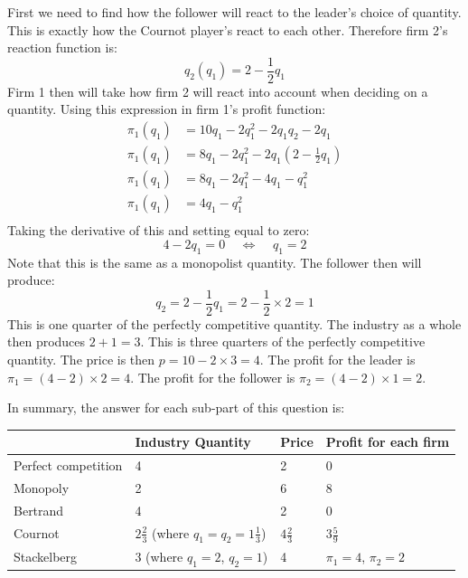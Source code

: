 \documentclass[12pt]{article}
\newcounter{question}[section]
\newenvironment{subquestions}{
  \begin{enumerate}[label=(\roman*)]}{\end{enumerate}}
\begin{document}
\begin{subquestions}
    \textcolor{solution-color}{
      First we need to find how the follower will react to the leader's choice
      of quantity. This is exactly how the Cournot player's react to each
      other. Therefore firm 2's reaction function is:
      \[
        q_2\left( q_1 \right)=2-\frac{1}{2}q_1
      \]
      Firm 1 then will take how firm 2 will react into account when deciding on
      a quantity. Using this expression in firm 1's profit function:
      \begin{align*}
        \pi_1\left( q_1 \right) & =  10q_1 - 2q_1^2 -2q_1q_2-2q_1 \\
        \pi_1\left( q_1 \right) &= 8q_1 - 2q_1^2 -2q_1\left(
        2-\frac{1}{2}q_1 \right) \\
        \pi_1\left( q_1 \right) &= 8q_1 - 2q_1^2 -4q_1-q_1^2 \\
        \pi_1\left( q_1 \right) &= 4q_1 - q_1^2  \\
      \end{align*}
      Taking the derivative of this and setting equal to zero:
      \[
        4- 2q_1=0 \;\;\;\;\Longleftrightarrow \;\;\;\; q_1 = 2
      \]
      Note that this is the same as a monopolist quantity. The follower then
      will produce:
      \[
        q_2 = 2-\frac{1}{2}q_1 = 2-\frac{1}{2}\times 2=1
      \]
      This is one quarter of the perfectly competitive quantity. The industry
      as a whole then produces $2+1=3$. This is three quarters of the perfectly
      competitive quantity. The price is then $p=10-2\times3=4$. The profit for
      the leader is $\pi_1=\left( 4-2 \right)\times 2 = 4$. The profit for the
      follower is $\pi_2=\left( 4-2 \right)\times 1 = 2$.
    }

    \textcolor{solution-color}{
      In summary, the answer for each sub-part of this question is:
      \begin{center}
        \begin{tabular}{l|lll} \hline\hline
          & Industry Quantity & Price & Profit for each firm \\ \hline
          Perfect competition &  4 & 2 & 0 \\
          Monopoly & 2 & 6 & 8 \\
          Bertrand & 4 & 2 & 0 \\
          Cournot & $2\frac{2}{3}$ (where $q_1=q_2=1\frac{1}{3}$) & $4\frac{2}{3}$ &
          $3\frac{5}{9}$ \\
          Stackelberg & 3 (where $q_1=2$, $q_2=1$) & 4 & $\pi_1=4$, $\pi_2=2$
          \\ \hline\hline
        \end{tabular}
      \end{center}
    }
\end{subquestions}
\end{document}
